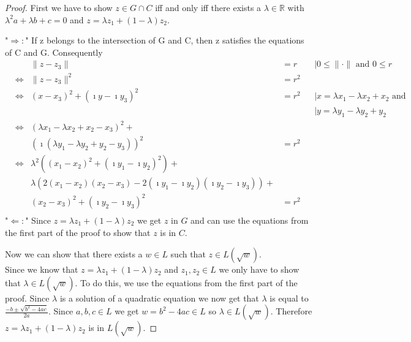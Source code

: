 \begin{proof}
    \leanok
First we have to show $z \in G \cap C$ iff and only iff there exists a $\lambda \in \mathbb{R}$ with $\lambda^2 a+ \lambda b + c = 0$ and $z = \lambda z_1 + (1-\lambda)z_2$.

"$\Rightarrow:$"  If z belongs to the intersection of G and C, then z satisfies the equations of C and G. Consequently
\begin{align*}
    &&\|z - z_3\| &= r &&\mid 0\le \|\cdot\|\text{ and }0\le r\\
    &\Leftrightarrow& \|z - z_3\|^2 &= r^2\\
    &\Leftrightarrow& (x - x_3)^2 + (\imath y - \imath y_3)^2 &= r^2 &&\mid x = \lambda x_1 - \lambda x_2 + x_2 \text{ and }\\ 
    &&&&&\mid y = \lambda y_1 - \lambda y_2 + y_2\\
    &\Leftrightarrow& (\lambda x_1 - \lambda x_2 + x_2 - x_3)^2 + \\
    &&(\imath (\lambda y_1 - \lambda y_2 + y_2 - y_3))^2 &= r^2\\
    &\Leftrightarrow& \lambda ^2 ((x_1 - x_2)^2 + (\imath y_1 - \imath y_2)^2) + \\
    &&\lambda (2(x_1 - x_2)(x_2 - x_3) - 2(\imath y_1 - \imath y_2)(\imath y_2 - \imath y_3)) + \\
    &&(x_2 - x_3)^2 + (\imath y_2 - \imath y_3)^2 &= r^2\\
\end{align*}
"$\Leftarrow:$" Since $z = \lambda z_1 + (1-\lambda)z_2$ we get $z$ in $G$ and can use the equations from the first part of the proof to show that $z$ is in $C$.

Now we can show that there exists a $w \in L$ such that $z \in L(\sqrt{w})$.\\
Since we know that $z = \lambda z_1 + (1-\lambda)z_2$ and $z_1, z_2 \in L$ we only have to show that $\lambda \in L(\sqrt{w})$.
To do this, we use the equations from the first part of the proof. 
Since $\lambda$ is a solution of a quadratic equation we now get that $\lambda$ is equal to $\frac{-b \pm \sqrt{b^2 - 4ac}}{2a}$. Since $a,b,c \in L$ we get $w = b^2 - 4ac \in L$ so $\lambda \in L(\sqrt{w})$. Therefore $z = \lambda z_1 + (1-\lambda)z_2$ is in $L(\sqrt{w})$.
\end{proof}
